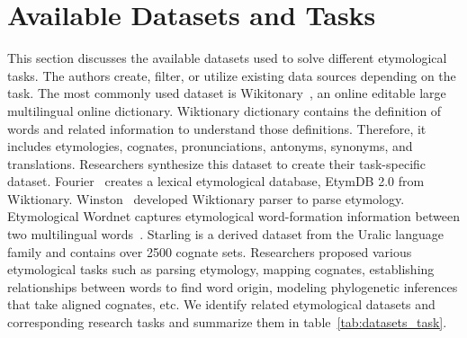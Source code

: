 \section{Available Datasets and Tasks}
This section discusses the available datasets used to solve different etymological tasks. The authors create, filter, or utilize existing data sources depending on the task. The most commonly used dataset is Wikitonary~\cite{wiktionary}, an online editable large multilingual online dictionary. Wiktionary dictionary contains the definition of words and related information to understand those definitions. Therefore, it includes etymologies, cognates, pronunciations, antonyms, synonyms, and translations. Researchers synthesize this dataset to create their task-specific dataset. Fourier~\cite{fourrier_methodological_2020} creates a lexical etymological database, EtymDB 2.0 from Wiktionary. Winston~\cite{wu_computational_2020} developed Wiktionary parser to parse etymology. Etymological Wordnet captures etymological word-formation information between two multilingual words~\cite{demelo_etymological_2014}. Starling is a derived dataset from the Uralic language family and contains over 2500 cognate sets\cite{nouri_alignment_2016}. Researchers proposed various etymological tasks such as parsing etymology, mapping cognates, establishing relationships between words to find word origin, modeling phylogenetic inferences that take aligned cognates, etc. We identify related etymological datasets and corresponding research tasks and summarize them in table~\ref{tab:datasets_task}.

